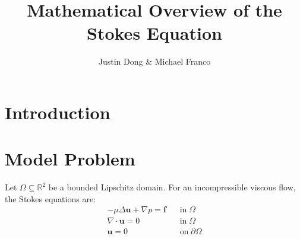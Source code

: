 \documentclass[10pt]{article}
\title{Mathematical Overview of the Stokes Equation}
\author{Justin Dong \& Michael Franco}
\numberwithin{equation}{section}
\begin{document}
	\maketitle
	
	\section{Introduction}
	
	\section{Model Problem}
	
	Let $\Omega \subseteq \mathbb{R}^{2}$ be a bounded Lipschitz domain. For an incompressible viscous flow, the Stokes equations are:
	\begin{align}
		-\mu\Delta \mathbf{u} + \nabla p = \mathbf{f} \;\;\;&\text{in}\;\Omega\\
		\nabla\cdot\mathbf{u} = 0 \;\;\;&\text{in}\;\Omega\\
		\mathbf{u} = 0 \;\;\;&\text{on}\;\partial\Omega
	\end{align}
\end{document}
